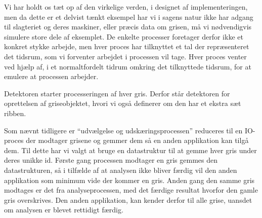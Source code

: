 Vi har holdt os tæt op af den virkelige verden, i designet af implementeringen, men da dette er et delvist tænkt eksempel har vi i  sagens natur ikke har adgang til slagteriet og deres maskiner, eller præcis data om grisen, må vi nødvendigvis simulere store dele af eksemplet. 
De enkelte processer foretager derfor ikke et konkret stykke arbejde, men hver proces har  tilknyttet et tal der repræsenteret det tidsrum, som vi forventer arbejdet i processen vil tage. Hver proces venter ved hjælp af, i et  normaltfordelt tidrum omkring det tilknyttede tidsrum, for at emulere at processen  arbejder.

Detektoren starter processeringen af hver gris. Derfor står detektoren for oprettelsen af griseobjektet, hvori vi også  definerer om den har et ekstra sæt ribben. 

Som nævnt tidligere er ``udvælgelse og udskæringsprocessen'' reduceres til en IO-proces der modtager grisene og gemmer dem så en anden applikation kan tilgå dem. Til dette har vi valgt at bruge en  datastruktur til at gemme  hver gris under deres unikke id. Første gang processen modtager en gris gemmes den datastrukturen, så i tilfælde af at analysen ikke bliver færdig vil den anden applikation som minimum vide der kommer en gris. Anden gang den samme gris modtages er det fra analyseprocessen, med det færdige resultat hvorfor  den gamle gris overskrives. Den anden applikation, kan kender derfor til alle grise, uansdet om analysen er blevet rettidigt færdig.



